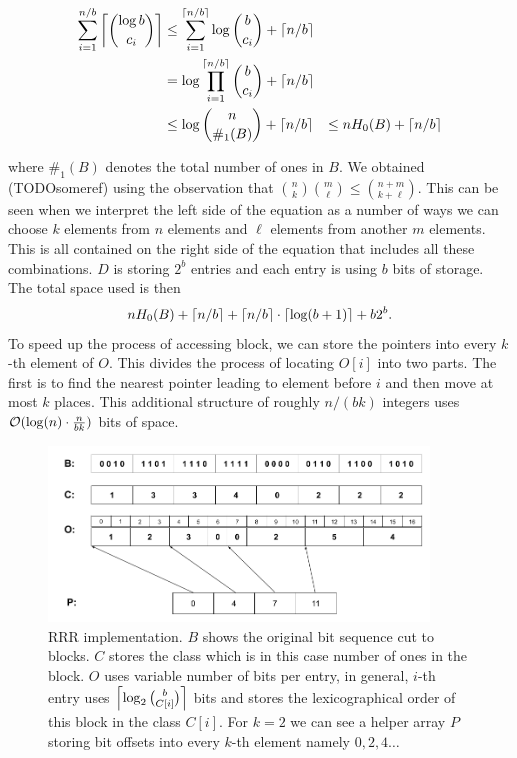 \begin{align*}
    \sum_{i=1}^{n/b} \left\lceil {\log b\choose c_i} \right\rceil
    &\leq \sum_{i=1}^{\left\lceil n/b \right\rceil} \log {b\choose c_i} + \left\lceil n/b \right\rceil \\
    &= \log\prod_{i=1}^{\left\lceil n/b \right\rceil} {b\choose c_i} + \left\lceil n/b \right\rceil \\
    &\leq \log{n\choose \#_1(B)} + \left\lceil n/b \right\rceil &\leq nH_0(B) + \left\lceil n/b \right\rceil
\end{align*}

where $\#_1(B)$ denotes the total number of ones in $B$. We obtained (TODOsomeref) using the
observation that ${n\choose k} {m\choose \ell} \leq {n+m\choose k+\ell}$. This can be seen
when we interpret the left side of the equation as a number of ways we can choose $k$ elements
from $n$ elements and $\ell$ elements from another $m$ elements. This is all contained on the
right side of the equation that includes all these combinations. $D$ is storing $2^b$ entries
and each entry is using $b$ bits of storage. The total space used is then
$$nH_0(B) + \left\lceil n/b \right\rceil + \left\lceil n/b \right\rceil \cdot \left\lceil \log(b+1) \right\rceil + b2^b.$$ To speed up the process
of accessing block, we can store the pointers into every $k$-th element of $O$. This divides
the process of locating $O[i]$ into two parts. The first is to find the nearest pointer leading
to element before $i$ and then move at most $k$ places. This additional structure of roughly
$n/(bk)$ integers uses $\mathcal{O}(\log(n)\cdot \frac{n}{bk})$ bits of space.

\begin{figure}
	\centerline{
		\includegraphics[width=0.9\textwidth, height=0.3\textheight]{images/rrr}
	}
	\caption[TODO]{RRR implementation. $B$ shows the original bit sequence cut to
    blocks. $C$ stores the class which is in this case number of ones in the block.
    $O$ uses variable number of bits per entry, in general, $i$-th entry uses
    $\left\lceil \log_2{b\choose C[i]} \right\rceil$ bits and stores the lexicographical order
    of this block in the class $C[i]$. For $k=2$ we can see a helper array $P$
    storing bit offsets into every $k$-th element namely $0, 2, 4\ldots$
	}
	\label{obr:RRRFinal}
\end{figure}

